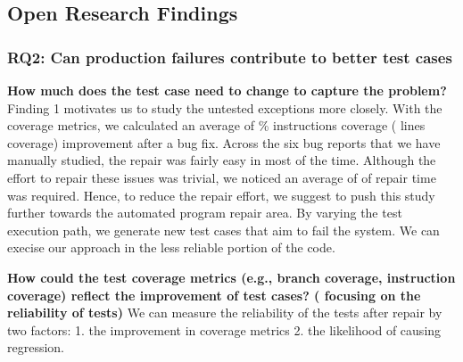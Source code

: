 \subsection{Open Research Findings}

	\subsubsection{RQ2: Can production failures contribute to better test cases}

		\textbf{How much does the test case need to change to capture the problem?} 
		Finding 1 motivates us to study the untested exceptions more closely. With the coverage metrics, we calculated an average of  \% instructions coverage ( lines coverage) improvement after a bug fix. Across the six bug reports that we have manually studied, the repair was fairly easy in most of the time. Although the effort to repair these issues was trivial, we noticed an average of  of repair time was required. Hence, to reduce the repair effort, we suggest to push this study further towards the automated program repair area.  By varying the test execution path, we generate new test cases that aim to fail the system. We can execise our approach in the less reliable portion of the code.  

		
		\textbf{How could the test coverage metrics (e.g., branch coverage, instruction coverage) reflect the improvement of test cases? ( focusing on the reliability of tests)} We can measure the reliability of the tests after repair by two factors: 1. the improvement in coverage metrics 2. the likelihood of causing regression. 
    ~\\